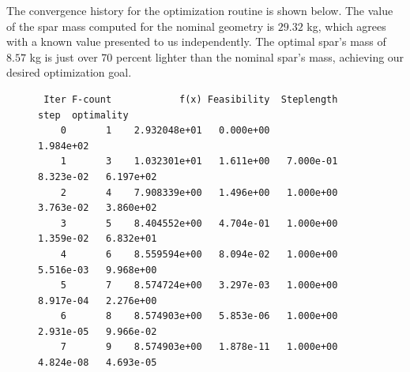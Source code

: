 \documentclass[10pt]{article}
\begin{document}
The convergence history for the optimization routine
is shown below. The value of the spar mass computed for the
nominal geometry is $29.32$ kg, which agrees with a known value
presented to us independently. The optimal spar's mass of $8.57$ kg
is just over 70 percent lighter than the nominal spar's mass,
achieving our desired optimization goal.
%
\begin{figure}[hbt!]
\scriptsize
\begin{verbatim}
 Iter F-count            f(x) Feasibility  Steplength        step  optimality
    0       1    2.932048e+01   0.000e+00                           1.984e+02
    1       3    1.032301e+01   1.611e+00   7.000e-01   8.323e-02   6.197e+02
    2       4    7.908339e+00   1.496e+00   1.000e+00   3.763e-02   3.860e+02
    3       5    8.404552e+00   4.704e-01   1.000e+00   1.359e-02   6.832e+01
    4       6    8.559594e+00   8.094e-02   1.000e+00   5.516e-03   9.968e+00
    5       7    8.574724e+00   3.297e-03   1.000e+00   8.917e-04   2.276e+00
    6       8    8.574903e+00   5.853e-06   1.000e+00   2.931e-05   9.966e-02
    7       9    8.574903e+00   1.878e-11   1.000e+00   4.824e-08   4.693e-05
\end{verbatim}
\label{fig:convergence}
\end{figure}
\end{document}
